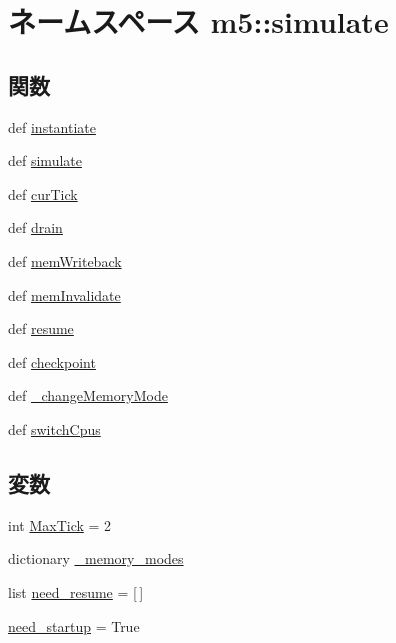 \hypertarget{namespacem5_1_1simulate}{
\section{ネームスペース m5::simulate}
\label{namespacem5_1_1simulate}
}
\subsection*{関数}
\begin{DoxyCompactItemize}
\item 
def \hyperlink{namespacem5_1_1simulate_a48d1fb163c2020416869a3bfd42b7913}{instantiate}
\item 
def \hyperlink{namespacem5_1_1simulate_a3bf1ccb8f6c13411a277600326562f5c}{simulate}
\item 
def \hyperlink{namespacem5_1_1simulate_a31b3d3628897d38d2c530832ef4907cf}{curTick}
\item 
def \hyperlink{namespacem5_1_1simulate_a125fb26cebcc172aca2d13dbf5a2f73c}{drain}
\item 
def \hyperlink{namespacem5_1_1simulate_a3749cab57b3758cee3da1f4138c380f2}{memWriteback}
\item 
def \hyperlink{namespacem5_1_1simulate_a76619a20f934a952b6551b37dfa0ce7c}{memInvalidate}
\item 
def \hyperlink{namespacem5_1_1simulate_a2985608bac11887a6ae3df9b068b10fe}{resume}
\item 
def \hyperlink{namespacem5_1_1simulate_a5fae4e20027ec1eaf6fdb333b9e4b2bf}{checkpoint}
\item 
def \hyperlink{namespacem5_1_1simulate_aa1c89476d25ce43527d97c047f909a12}{\_\-changeMemoryMode}
\item 
def \hyperlink{namespacem5_1_1simulate_a962abc699043c45d6c8c3057469e1aec}{switchCpus}
\end{DoxyCompactItemize}
\subsection*{変数}
\begin{DoxyCompactItemize}
\item 
int \hyperlink{namespacem5_1_1simulate_a2c372e2e14aee3b7fbcfbd49210559d7}{MaxTick} = 2
\item 
dictionary \hyperlink{namespacem5_1_1simulate_ab4c814bc9719fb6019f8b1ddc4e3bf81}{\_\-memory\_\-modes}
\item 
list \hyperlink{namespacem5_1_1simulate_a032ac35775aee51d7a28909bc144b1ed}{need\_\-resume} = \mbox{[}$\,$\mbox{]}
\item 
\hyperlink{namespacem5_1_1simulate_a0e9c92fcadba6c1848a6cacce579e3b8}{need\_\-startup} = True
\end{DoxyCompactItemize}


